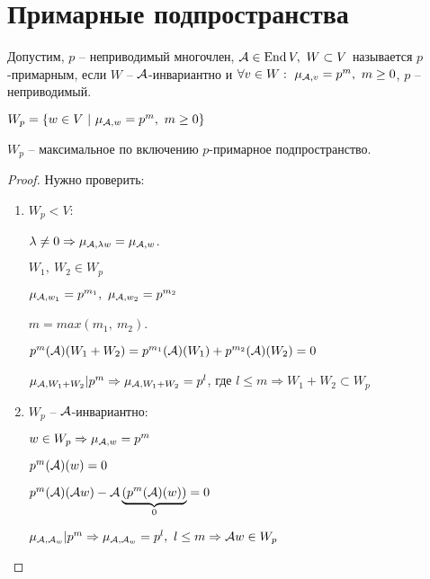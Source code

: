 \documentclass[main]{subfiles}
\begin{document}
\chapter{Примарные подпространства}

\begin{definition} 
    Допустим, $p$ -- неприводимый многочлен, $\mca \in \End V, \ W \subset V$ называется $p$-примарным, если $W$ -- $\mathcal{A}$-инвариантно
    и $\forall v \in W: \ \mu_{\mathcal{A}, v} = p^m, \ m \geq 0$, $p$ -- неприводимый.

    \begin{center}$W_p = \{w \in V \ | \ \mu_{\mathcal{A}, w} = p^m, \ m \geq 0\}$ \end{center}
\end{definition}

\begin{proposition}
    $W_p$ -- максимальное по включению $p$-примарное подпространство.
\end{proposition}

\begin{proof}
    Нужно проверить:
    \begin{enumerate}
        \item $W_p < V$:
              \begin{center}
                  $\lambda \neq 0 \Rightarrow \mu_{\mathcal{A}, \lambda w} = \mu_{\mathcal{A}, w}$.

                  $W_1, \ W_2 \in W_p$

                  $\mu_{\mathcal{A}, w_1} = p^{m_1}, \ \mu_{\mathcal{A}, w_2} = p^{m_2}$

                  $ m = max(m_1, \ m_2)$.

                  $p^m(\mathcal{A})(W_1+W_2) = p^{m_1}(\mathcal{A})(W_1)+ p^{m_2}(\mathcal{A})(W_2) = 0 $

                  $\mu_{\mathcal{A}, W_1 +W_2} | p^m \Rightarrow \mu_{\mathcal{A}, W_1 +W_2} = p^l$, где $l \leq m \Rightarrow W_1+W_2 \subset W_p$
              \end{center}

        \item $W_p$ -- $\mathcal{A}$-инвариантно:
              \begin{center}
                  $w \in W_p \Rightarrow \mu_{\mathcal{A}, w} = p^m$

                  $p^m(\mathcal{A})(w) = 0$

                  $p^m(\mathcal{A})(\mathcal{A} w) - \mathcal{A}\underbrace{(p^m(\mathcal{A})(w))}_{0} = 0 $

                  $ \mu_{\mathcal{A}, \mathcal{A}_w} | p^m \Rightarrow \mu_{\mathcal{A}, \mathcal{A}_w} = p^l, \ l \leq m \Rightarrow \mathcal{A} w \in W_p$
              \end{center}

    \end{enumerate}
\end{proof}
\end{document}
